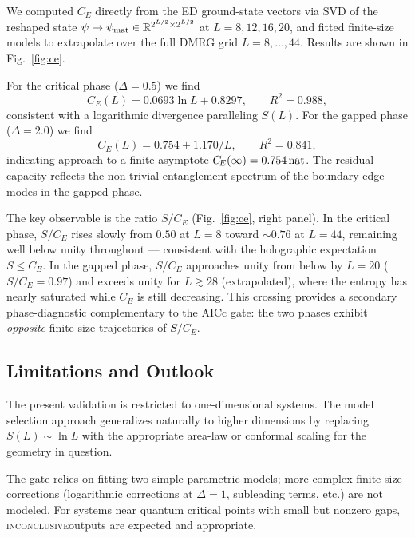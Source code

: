 \documentclass[11pt,letterpaper]{article}
\newcommand{\CE}{C_{\!E}}
\newcommand{\inconclusive}{\textsc{inconclusive}}
\begin{document}
We computed $\CE$ directly from the ED ground-state vectors via SVD
of the reshaped state $\psi \mapsto \psi_{\rm mat} \in
\mathbb{R}^{2^{L/2}\times 2^{L/2}}$ at $L = 8, 12, 16, 20$, and
fitted finite-size models to extrapolate over the full DMRG grid
$L = 8,\ldots,44$.  Results are shown in Fig.~\ref{fig:ce}.

For the critical phase ($\Delta=0.5$) we find
\begin{equation}
  \CE(L) = 0.0693\ln L + 0.8297, \qquad R^2 = 0.988,
  \label{eq:ce_crit}
\end{equation}
consistent with a logarithmic divergence paralleling $S(L)$.
For the gapped phase ($\Delta=2.0$) we find
\begin{equation}
  \CE(L) = 0.754 + 1.170/L, \qquad R^2 = 0.841,
  \label{eq:ce_gapped}
\end{equation}
indicating approach to a finite asymptote $\CE(\infty) = 0.754\,{\rm nat}$.
The residual capacity reflects the non-trivial entanglement spectrum of
the boundary edge modes in the gapped phase.

The key observable is the ratio $S/\CE$ (Fig.~\ref{fig:ce}, right panel).
In the critical phase, $S/\CE$ rises slowly from $0.50$ at $L=8$ toward
$\sim 0.76$ at $L=44$, remaining well below unity throughout — consistent
with the holographic expectation $S \le \CE$.  In the gapped phase,
$S/\CE$ approaches unity from below by $L=20$ ($S/\CE = 0.97$) and
exceeds unity for $L \gtrsim 28$ (extrapolated), where the entropy has
nearly saturated while $\CE$ is still decreasing.  This crossing
provides a secondary phase-diagnostic complementary to the AICc gate:
the two phases exhibit \emph{opposite} finite-size trajectories of
$S/\CE$.

\subsection{Limitations and Outlook}

The present validation is restricted to one-dimensional systems.  The
model selection approach generalizes naturally to higher dimensions by
replacing $S(L) \sim \ln L$ with the appropriate area-law or conformal
scaling for the geometry in question.

The gate relies on fitting two simple parametric models; more complex
finite-size corrections (logarithmic corrections at $\Delta=1$, subleading
terms, etc.) are not modeled.  For systems near quantum critical points with
small but nonzero gaps, \inconclusive outputs are expected and appropriate.
\end{document}
